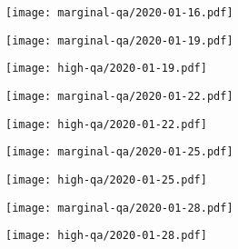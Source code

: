 \documentclass{article}
\begin{document}
\begin{figure}[H]
	\ContinuedFloat
	\centering
	\begin{subfigure}{\linewidth}
		\hspace{0.25cm}
		\texttt{[image: marginal-qa/2020-01-16.pdf]}
	\end{subfigure}
	\begin{subfigure}{0.48\linewidth}
		\texttt{[image: marginal-qa/2020-01-19.pdf]}
	\end{subfigure}
	\begin{subfigure}{0.48\linewidth}
		\texttt{[image: high-qa/2020-01-19.pdf]}
	\end{subfigure}
	\begin{subfigure}{0.48\linewidth}
		\texttt{[image: marginal-qa/2020-01-22.pdf]}
	\end{subfigure}
	\begin{subfigure}{0.48\linewidth}
		\texttt{[image: high-qa/2020-01-22.pdf]}
	\end{subfigure}
	\begin{subfigure}{0.48\linewidth}
		\texttt{[image: marginal-qa/2020-01-25.pdf]}
	\end{subfigure}
	\begin{subfigure}{0.48\linewidth}
		\texttt{[image: high-qa/2020-01-25.pdf]}
	\end{subfigure}
	\begin{subfigure}{0.48\linewidth}
		\texttt{[image: marginal-qa/2020-01-28.pdf]}
	\end{subfigure}
	\begin{subfigure}{0.48\linewidth}
		\texttt{[image: high-qa/2020-01-28.pdf]}
	\end{subfigure}
\end{figure}
\end{document}
